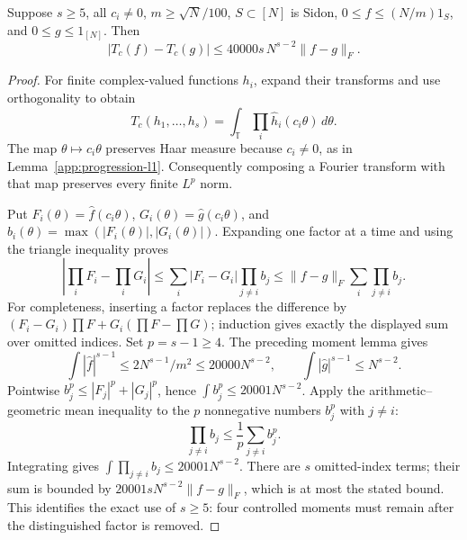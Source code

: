 \begin{lemma}
\label{app:counting-transfer}
\leanok
{}
Suppose $s\geq5$, all $c_i\ne0$, $m\geq\sqrt N/100$, $S\subset[N]$ is
Sidon, $0\leq f\leq(N/m)1_S$, and $0\leq g\leq1_{[N]}$.  Then
\[
 |T_c(f)-T_c(g)|\leq40000s\,N^{s-2}\|f-g\|_F.
\]
\end{lemma}
\begin{proof}
For finite complex-valued functions $h_i$, expand their transforms and use
orthogonality to obtain
\[
 T_c(h_1,\ldots,h_s)
   =\int_{\mathbb T}\prod_i\widehat h_i(c_i\theta)\,d\theta.
\]
The map $\theta\mapsto c_i\theta$ preserves Haar measure because
$c_i\ne0$, as in Lemma~\ref{app:progression-l1}.
Consequently composing a Fourier transform with that map preserves every
finite $L^p$ norm.

Put $F_i(\theta)=\widehat f(c_i\theta)$,
$G_i(\theta)=\widehat g(c_i\theta)$, and
$b_i(\theta)=\max(|F_i(\theta)|,|G_i(\theta)|)$.
Expanding one factor at a time and using the triangle inequality proves
\[
 \left|\prod_iF_i-\prod_iG_i\right|
 \leq\sum_i|F_i-G_i|\prod_{j\ne i}b_j
 \leq\|f-g\|_F\sum_i\prod_{j\ne i}b_j.
\]
For completeness, inserting a factor replaces the difference by
$(F_i-G_i)\prod F+G_i(\prod F-\prod G)$; induction gives exactly the
displayed sum over omitted indices.
Set $p=s-1\geq4$.  The preceding moment lemma gives
\[
 \int|\widehat f|^{s-1}\leq2N^{s-1}/m^2\leq20000N^{s-2},
 \qquad \int|\widehat g|^{s-1}\leq N^{s-2}.
\]
Pointwise $b_j^p\leq|F_j|^p+|G_j|^p$, hence
$\int b_j^p\leq20001N^{s-2}$.
Apply the arithmetic--geometric mean inequality to the $p$ nonnegative
numbers $b_j^p$ with $j\ne i$:
\[
 \prod_{j\ne i}b_j\leq\frac1p\sum_{j\ne i}b_j^p.
\]
Integrating gives $\int\prod_{j\ne i}b_j\leq20001N^{s-2}$.
There are $s$ omitted-index terms; their sum is bounded by
$20001sN^{s-2}\|f-g\|_F$, which is at most the stated bound.
This identifies the exact use of $s\geq5$: four controlled moments must
remain after the distinguished factor is removed.
\end{proof}

